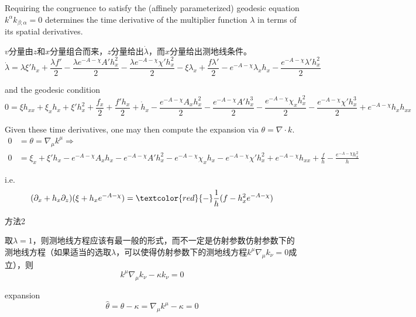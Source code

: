 \documentclass[12pt,a4paper]{ctexart}
\numberwithin{equation}{section}
\begin{document}
Requiring the congruence to satisfy the (affinely parameterized) geodesic equation $k^\alpha k_{\beta;\alpha}=0$ determines the time derivative of the multiplier function $\lambda$ in terms of its spatial derivatives.

$v$分量由$z$和$x$分量组合而来，$z$分量给出$\dot{\lambda}$，而$x$分量给出测地线条件。
\begin{equation}
    \dot{\lambda}=\lambda \xi' h_x + \frac{\lambda f'}{2} - \frac{\lambda e^{-A-\chi} A' h_x^2}{2} - \frac{\lambda e^{-A-\chi} \chi' h_x^2}{2} - \xi \lambda_x + \frac{f \lambda'}{2} - e^{-A-\chi} \lambda_x h_x - \frac{e^{-A-\chi} \lambda' h_x^2}{2}
\end{equation}

and the geodesic condition
\begin{equation}
    0=\xi h_{xx} + \xi_x h_x + \xi' h_x^2 + \frac{f_x}{2} + \frac{f' h_x}{2} + \dot{h}_x - \frac{e^{-A-\chi} A_x h_x^2}{2} - \frac{e^{-A-\chi} A' h_x^3}{2} - \frac{e^{-A-\chi} \chi_x h_x^2}{2} - \frac{e^{-A-\chi} \chi' h_x^3}{2} + e^{-A-\chi} h_x h_{xx}
\end{equation}

Given these time derivatives, one may then compute the expansion via $\theta=\nabla\cdot k$.
\begin{equation}
    \begin{aligned}
        0&=\theta=\nabla_\mu k^\mu\Rightarrow\\
        0&=\xi_x + \xi' h_x - e^{-A-\chi} A_x h_x - e^{-A-\chi} A' h_x^2 - e^{-A-\chi} \chi_x h_x - e^{-A-\chi} \chi' h_x^2 + e^{-A-\chi} h_{xx} + \frac{f}{h} - \frac{e^{-A-\chi} h_x^2}{h}
    \end{aligned}
\end{equation}

i.e.
\begin{equation}
    (\partial_{x}+h_{x}\partial_{z})(\xi+h_{x}e^{-A-\chi})=\textcolor{red}{-}\frac{1}{h}(f-h_{x}^{2}e^{-A-\chi})
\end{equation}

方法2

取$\lambda=1$，则测地线方程应该有最一般的形式，而不一定是仿射参数仿射参数下的测地线方程（如果适当的选取$\lambda$，可以使得仿射参数下的测地线方程$k^\mu\nabla_\mu k_\nu=0$成立），则
\begin{equation}
    k^\mu\nabla_\mu k_\nu-\kappa k_\nu=0
\end{equation}

expansion
\begin{equation}
    \hat{\theta}=\theta-\kappa=\nabla_\mu k^\mu-\kappa=0
\end{equation}
\end{document}
